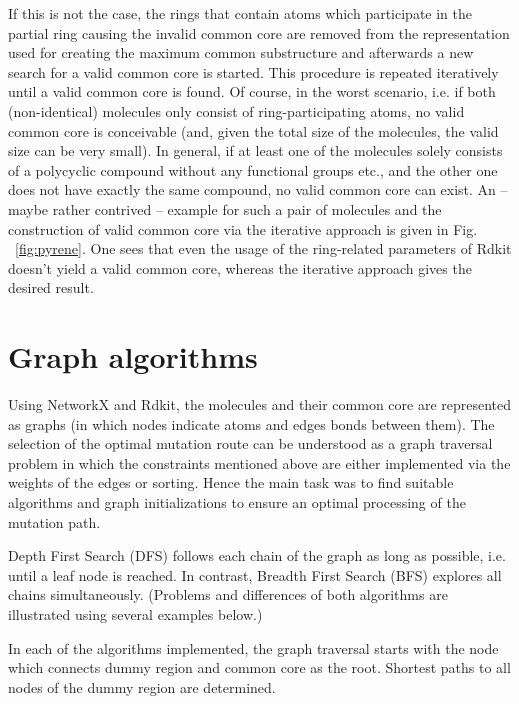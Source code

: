 If this is not the case, the rings that contain atoms which participate in the partial ring causing the invalid common core are removed from the representation used for creating the maximum common substructure and afterwards a new search for a valid common core is started. This procedure is repeated iteratively until a valid common core is found.
Of course, in the worst scenario, i.e. if both (non-identical) molecules only consist of ring-participating atoms, no valid common core is conceivable (and, given the total size of the molecules, the valid size can be very small). In general, if at least one of the molecules solely consists of a polycyclic compound without any functional groups etc., and the other one does not have exactly the same compound, no valid common core can exist. 
An – maybe rather contrived – example for such a pair of molecules and the construction of valid common core via the iterative approach is given in Fig. ~\ref{fig:pyrene}. One sees that even the usage of the ring-related parameters of Rdkit doesn't yield a valid common core, whereas the iterative approach gives the desired result.



\section{Graph algorithms}

Using NetworkX and Rdkit, the molecules and their common core are
represented as graphs (in which nodes indicate atoms and edges bonds
between them). The selection of the optimal mutation route can be
understood as a graph traversal problem in which the constraints mentioned
above are either implemented via the weights of the edges or sorting.
Hence the main task was to find suitable algorithms and graph initializations
to ensure an optimal processing of the mutation path.

Depth First Search (DFS) follows each chain of the graph as long as
possible, i.e. until a leaf node is reached. In contrast, Breadth
First Search (BFS) explores all chains simultaneously.\cite{Even.2012}
(Problems and differences of both algorithms are illustrated using
several examples below.)

In each of the algorithms implemented, the graph traversal starts
with the node which connects dummy region and common core as the root.
Shortest paths to all nodes of the dummy region are determined.

